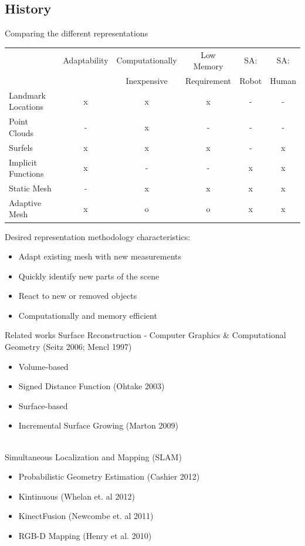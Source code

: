 \documentclass{beamer}
\begin{document}
\subsection{History}

\begin{frame}{Comparing the different representations}
{
\oddsidemargin -0.9in
\color{black}
\begin{table}[h]
\begin{footnotesize}
\begin{center}
\begin{tabular}{|l|c|c|c|c|c|}
\hline
\multirow{2}{*}{} & Adaptability & Computationally & Low Memory & SA: & SA: \\
 & & Inexpensive & Requirement & Robot & Human \\\hline
Landmark Locations  	& x & x & x & - & - \\
Point Clouds		& - & x & - & - & - \\
Surfels             	& x & x & x & - & x \\
Implicit Functions 	& x & - & - & x & x \\
Static Mesh	 	& - & x & x & x & x \\
Adaptive Mesh	 	& x & o & o & x & x \\
\hline
\end{tabular}
\end{center}
\end{footnotesize}
\end{table}
}
\vspace{-.5in}
Desired representation methodology characteristics:
\begin{itemize}
\item Adapt existing mesh with new measurements
\item Quickly identify new parts of the scene
\item React to new or removed objects
\item Computationally and memory efficient
\end{itemize}
\end{frame}

\begin{frame}{Related works}
Surface Reconstruction - Computer Graphics \& Computational Geometry (Seitz
2006; Mencl 1997) 
\begin{itemize}
\item Volume-based
\item Signed Distance Function (Ohtake 2003)
\item Surface-based
\item Incremental Surface Growing (Marton 2009)
\end{itemize}
~\\
Simultaneous Localization and Mapping (SLAM)
\begin{itemize}
\item Probabilistic Geometry Estimation (Cashier 2012)
\item Kintinuous (Whelan et. al 2012)
\item KinectFusion (Newcombe et. al 2011)
\item RGB-D Mapping (Henry et al. 2010)
\end{itemize}
\end{frame}
\end{document}
